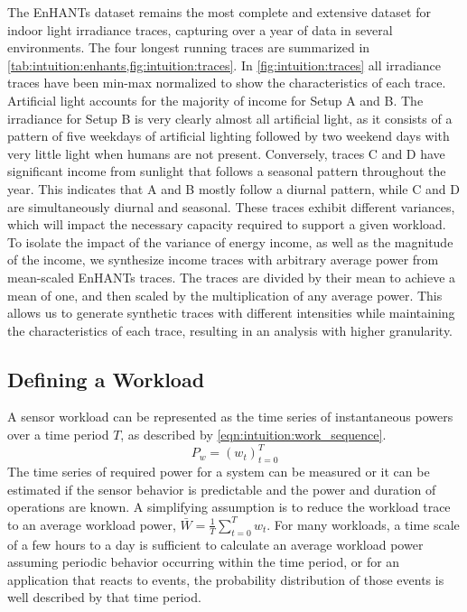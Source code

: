 The EnHANTs dataset remains the most complete and extensive dataset for indoor light
irradiance traces, capturing over a year of data in several environments.
The four longest running traces are summarized in \cref{tab:intuition:enhants,fig:intuition:traces}.
In \cref{fig:intuition:traces} all irradiance traces have been min-max normalized to show the characteristics of each trace.
Artificial light accounts for the majority of income for Setup A and B.
The irradiance for Setup B is very clearly almost all artificial light, as it consists of a pattern of five weekdays of artificial lighting followed by two weekend days with very little light when humans are not present. 
Conversely, traces C and D have significant income from sunlight that follows a seasonal pattern throughout the year.
This indicates that A and B mostly follow a diurnal pattern, while C and D are simultaneously diurnal and seasonal.
These traces exhibit different variances, which will impact the necessary capacity required to support a given workload.
To isolate the impact of the variance of energy income, as well as the magnitude of the income, we synthesize income traces with arbitrary average power from mean-scaled EnHANTs traces. The traces are divided by their mean to achieve a mean of one, and then scaled by the multiplication of any average power.
This allows us to generate synthetic traces with different intensities while maintaining the characteristics of each trace, resulting in an analysis with higher granularity.

\subsection{Defining a Workload}
A sensor workload can be represented as the time series of instantaneous powers over a time period $T$, as described by \cref{eqn:intuition:work_sequence}.
\begin{equation} \label{eqn:intuition:work_sequence}
    P_w = (w_{t})^{T}_{t=0}
\end{equation}
The time series of required power for a system can be measured or it can be estimated if the sensor behavior is predictable and the power and duration of operations are known.
A simplifying assumption is to reduce the workload trace to an average workload power, $\bar{W} = \frac{1}{T}\sum_{t=0}^T w_t$.
For many workloads, a time scale of a few hours to a day is sufficient to calculate an average workload power assuming periodic behavior occurring within the time period, or for an application that reacts to events, the probability distribution of those events is well described by that time period.



